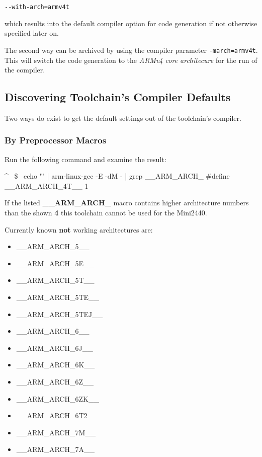 \texttt{-{}-with-arch=armv4t}

which results into the default compiler option for code generation if not
otherwise specified later on.

The second way can be archived by using the compiler parameter
\texttt{-march=armv4t}. This will switch the code generation to the
\textit{ARMv4 core architecure} for the run of the compiler.

\subsection{Discovering Toolchain's Compiler Defaults}

Two ways do exist to get the default settings out of the toolchain's compiler.

\subsubsection{By Preprocessor Macros}

Run the following command and examine the result:

\begin{ptxshell}[escapechar=~]{^}
~\$~ echo "" | arm-linux-gcc -E -dM - | grep __ARM_ARCH_
#define __ARM_ARCH_4T__ 1
\end{ptxshell}

If the listed \textbf{\_\_ARM\_ARCH\_} macro contains higher architecture numbers
than the shown \textbf{4} this toolchain cannot be used for the Mini2440.

Currently known \textbf{not} working architectures are:

\begin{itemize}
	\item \_\_ARM\_ARCH\_5\_\_
	\item \_\_ARM\_ARCH\_5E\_\_
	\item \_\_ARM\_ARCH\_5T\_\_
	\item \_\_ARM\_ARCH\_5TE\_\_
	\item \_\_ARM\_ARCH\_5TEJ\_\_
	\item \_\_ARM\_ARCH\_6\_\_
	\item \_\_ARM\_ARCH\_6J\_\_
	\item \_\_ARM\_ARCH\_6K\_\_
	\item \_\_ARM\_ARCH\_6Z\_\_
	\item \_\_ARM\_ARCH\_6ZK\_\_
	\item \_\_ARM\_ARCH\_6T2\_\_
	\item \_\_ARM\_ARCH\_7M\_\_
	\item \_\_ARM\_ARCH\_7A\_\_
\end{itemize}


